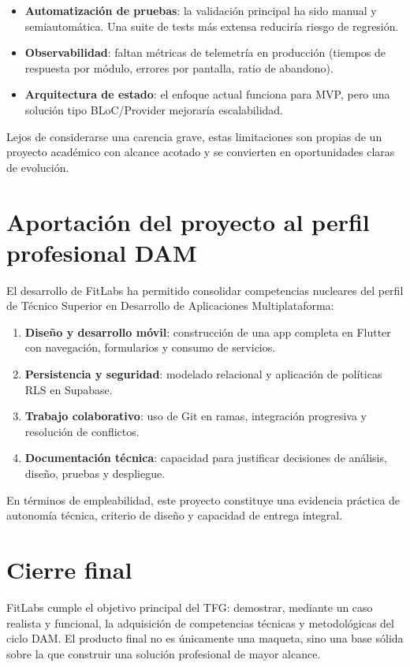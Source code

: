 \begin{itemize}
  \item \textbf{Automatización de pruebas}: la validación principal ha sido manual y semiautomática. Una suite de tests más extensa reduciría riesgo de regresión.
  \item \textbf{Observabilidad}: faltan métricas de telemetría en producción (tiempos de respuesta por módulo, errores por pantalla, ratio de abandono).
  \item \textbf{Arquitectura de estado}: el enfoque actual funciona para MVP, pero una solución tipo BLoC/Provider mejoraría escalabilidad.
\end{itemize}

Lejos de considerarse una carencia grave, estas limitaciones son propias de un proyecto académico con alcance acotado y se convierten en oportunidades claras de evolución.

\section{Aportación del proyecto al perfil profesional DAM}

El desarrollo de FitLabs ha permitido consolidar competencias nucleares del perfil de Técnico Superior en Desarrollo de Aplicaciones Multiplataforma:

\begin{enumerate}
  \item \textbf{Diseño y desarrollo móvil}: construcción de una app completa en Flutter con navegación, formularios y consumo de servicios.
  \item \textbf{Persistencia y seguridad}: modelado relacional y aplicación de políticas RLS en Supabase.
  \item \textbf{Trabajo colaborativo}: uso de Git en ramas, integración progresiva y resolución de conflictos.
  \item \textbf{Documentación técnica}: capacidad para justificar decisiones de análisis, diseño, pruebas y despliegue.
\end{enumerate}

En términos de empleabilidad, este proyecto constituye una evidencia práctica de autonomía técnica, criterio de diseño y capacidad de entrega integral.

\section{Cierre final}

FitLabs cumple el objetivo principal del TFG: demostrar, mediante un caso realista y funcional, la adquisición de competencias técnicas y metodológicas del ciclo DAM. El producto final no es únicamente una maqueta, sino una base sólida sobre la que construir una solución profesional de mayor alcance.
